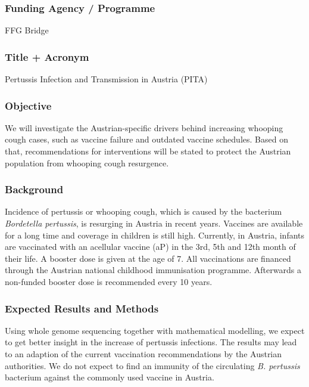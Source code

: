 \documentclass[10pt,a4paper]{article}\usepackage[]{graphicx}\usepackage[]{color}
\author{Lukas Richter}
\begin{document}
\pagestyle{fancy}

\subsubsection*{Funding Agency / Programme}
FFG Bridge

\subsubsection*{Title + Acronym}
Pertussis Infection and Transmission in Austria (PITA)

\subsubsection*{Objective}
We will investigate the Austrian-specific drivers behind increasing whooping cough cases, such as vaccine failure and outdated vaccine schedules. Based on that, recommendations for interventions will be stated to protect the Austrian population from whooping cough resurgence.

\subsubsection*{Background}
Incidence of pertussis or whooping cough, which is caused by the bacterium \textit{Bordetella pertussis}, is resurging in Austria in recent years. Vaccines are available for a long time and coverage in children is still high. Currently, in Austria, infants are vaccinated with an acellular vaccine (aP) in the 3rd, 5th and 12th month of their life. A booster dose is given at the age of 7. All vaccinations are financed through the Austrian national childhood immunisation programme. Afterwards a non-funded booster dose is recommended every 10 years. %

\subsubsection*{Expected Results and Methods}
Using whole genome sequencing together with mathematical modelling, we expect to get better insight in the increase of pertussis infections. The results may lead to an adaption of the current vaccination recommendations by the Austrian authorities. We do not expect to find an immunity of the circulating \textit{B. pertussis} bacterium against the commonly used vaccine in Austria.
\end{document}

